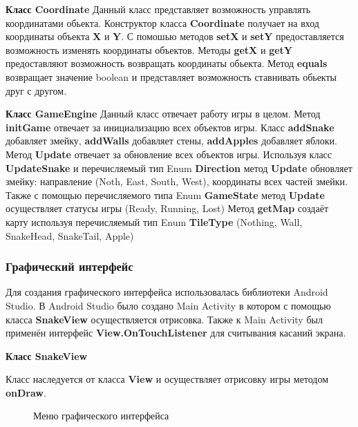 	\item \textbf{Класс Coordinate}
	Данный класс представляет возможность управлять координатами обьекта. Конструктор класса \textbf{Coordinate} получает на вход координаты объекта \textbf{X} и \textbf{Y}. С помошью методов \textbf{setX} и \textbf{setY} предоставляется возможность изменять координаты объектов. Методы \textbf{getX} и \textbf{getY} предоставляют возможность возвращать координаты обьекта. Метод \textbf{equals} возвращает значение boolean и представляет возможность ставнивать обьекты друг с другом.
	
	\item \textbf{Класс GameEngine}
	Данный класс отвечает работу игры в целом. 
	Метод \textbf{initGame} отвечает за инициализацию всех объектов игры. Класс \textbf{addSnake} добавляет змейку, \textbf{addWalls}  добавляет стены, \textbf{addApples} добавляет яблоки.
	Метод \textbf{Update} отвечает за обновление всех объектов игры. Используя класс \textbf{UpdateSnake} и перечисляемый тип Enum \textbf{Direction} метод \textbf{Update} обновляет змейку: направление (Noth, East, South, West), координаты всех частей змейки. Также с помощью перечисляемого типа Enum \textbf{GameState} метод \textbf{Update} осуществляет статусы игры (Ready, Running, Lost)
	Метод \textbf{getMap} создаёт карту используя перечисляемый тип Enum \textbf{TileType} (Nothing, Wall, SnakeHead, SnakeTail, Apple)
	
	\subsubsection{Графический интерфейс}
	
	Для создания графического интерфейса использовалась библиотеки Android Studio. 
	В Android Studio было создано Main Activity в котором с помощью класса \textbf{SnakeView} осуществляется отрисовка. Также к Main Activity был применён интерфейс \textbf{View.OnTouchListener} для считывания касаний экрана.
	
	\item \textbf{Класс SnakeView}
	
	Класс наследуется от класса \textbf{View} и осуществляет отрисовку игры методом \textbf{onDraw}.
	
	\begin{figure}[H]
		\begin{center}
			\caption{Меню графического интерфейса}
			\label{pic:android_menu}
		\end{center}
	\end{figure} 
	
